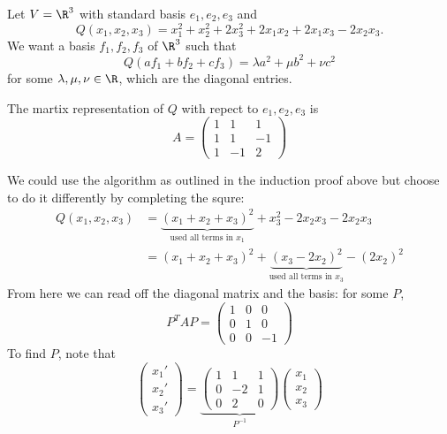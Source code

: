 \documentclass[a4paper]{article}
\theoremstyle{definition}
\begin{document}
\begin{eg}
  Let \(V = \R^3\) with standard basis \(e_1, e_2, e_3\) and
  \[
    Q(x_1, x_2, x_3) = x_1^2 + x_2^2 + 2x_3^2 + 2x_1x_2 + 2x_1x_3 -2x_2x_3.
  \]
  We want a basis \(f_1, f_2, f_3\) of \(\R^3\) such that
  \[
    Q(af_1 + bf_2 + cf_3) = \lambda a^2 + \mu b^2 + \nu c^2
  \]
  for some \(\lambda, \mu, \nu \in \R\), which are the diagonal entries.

  The martix representation of \(Q\) with repect to \(e_1, e_2, e_3\) is
  \[
    A =
    \begin{pmatrix}
      1 & 1 & 1 \\
      1 & 1 & -1 \\
      1 & -1 & 2
    \end{pmatrix}
  \]

  We could use the algorithm as outlined in the induction proof above but choose to do it differently by completing the squre:
    \begin{align*}
      Q(x_1, x_2, x_3) &= \underbrace{(x_1 + x_2 + x_3)^2}_{\text{used all terms in } x_1} + x_3^2 - 2x_2x_3 - 2 x_2x_3 \\
                       &= (x_1 + x_2 + x_3)^2 + \underbrace{(x_3 - 2x_2)^2}_{\text{used all terms in } x_3} - (2x_2)^2
    \end{align*}
    From here we can read off the diagonal matrix and the basis: for some \(P\),
    \[
      P^TAP =
      \begin{pmatrix}
        1 & 0 & 0 \\
        0 & 1 & 0 \\
        0 & 0 & -1
      \end{pmatrix}
    \]
    To find \(P\), note that
    \[
      \begin{pmatrix}
        x_1' \\
        x_2' \\
        x_3'
      \end{pmatrix}
      =
      \underbrace{
      \begin{pmatrix}
        1 & 1 & 1 \\
        0 & -2 & 1 \\
        0 & 2 & 0 
      \end{pmatrix}
    }_{P^{-1}}
    \begin{pmatrix}
      x_1 \\
      x_2 \\
      x_3
    \end{pmatrix}
    \]
\end{eg}
\end{document}
